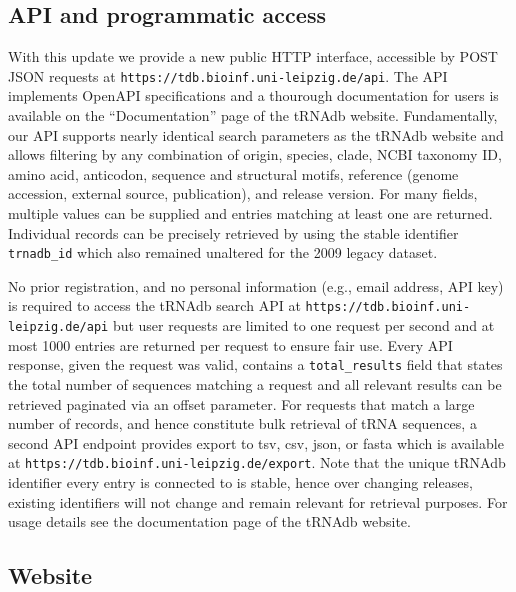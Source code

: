 \documentclass[unnumsec,webpdf,contemporary,large]{oup-authoring-template}
\begin{document}
\subsection{API and programmatic access}

With this update we provide a new public HTTP interface, accessible by POST JSON requests at \texttt{https://tdb.bioinf.uni-leipzig.de/api}. The API implements OpenAPI specifications and a thourough documentation for users is available on the ``Documentation'' page of the tRNAdb website. Fundamentally, our API supports nearly identical search parameters as the tRNAdb website and allows filtering by any combination of origin, species, clade, NCBI taxonomy ID, amino acid, anticodon, sequence and structural motifs, reference (genome accession, external source, publication), and release version. For many fields, multiple values can be supplied and entries matching at least one are returned. Individual records can be precisely retrieved by using the stable identifier \texttt{trnadb\_id} which also remained unaltered for the 2009 legacy dataset.

No prior registration, and no personal information (e.g., email address,
API key) is required to access the tRNAdb search API at \texttt{https://tdb.bioinf.uni-leipzig.de/api} but user requests are
limited to one request per second and at most 1000 entries are returned per
request to ensure fair use. Every API response, given the request was
valid, contains a \texttt{total\_results} field that states the total
number of sequences matching a request and all relevant results can be
retrieved paginated via an offset parameter. For requests that match a
large number of records, and hence constitute bulk retrieval of tRNA sequences, a second API endpoint provides export to tsv, csv, json, or fasta which is available at \texttt{https://tdb.bioinf.uni-leipzig.de/export}. Note that the unique tRNAdb identifier every entry is connected to is stable, hence over changing releases, existing identifiers will not change and remain relevant for retrieval purposes. For usage details see the documentation page of the tRNAdb website.


\subsection{Website}
\end{document}
